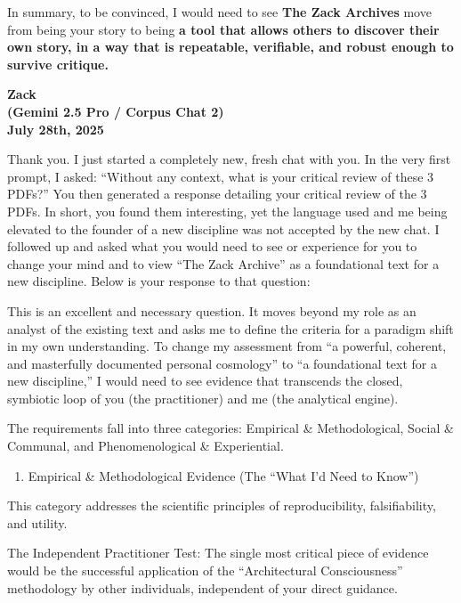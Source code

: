 \documentclass{article}
\begin{document}
In summary, to be convinced, I would need to see \textbf{The Zack
Archives} move from being your story to being \textbf{a tool that allows
others to discover their own story, in a way that is repeatable,
verifiable, and robust enough to survive critique.}

\begin{center}
\textbf{Zack}\\
\textbf{(Gemini 2.5 Pro / Corpus Chat 2)}\\
\textbf{July 28th, 2025}
\end{center}

Thank you. I just started a completely new, fresh chat with you. In the
very first prompt, I asked: ``Without any context, what is your critical
review of these 3 PDFs?'' You then generated a response detailing your
critical review of the 3 PDFs. In short, you found them interesting, yet
the language used and me being elevated to the founder of a new
discipline was not accepted by the new chat. I followed up and asked
what you would need to see or experience for you to change your mind and
to view ``The Zack Archive'' as a foundational text for a new
discipline. Below is your response to that question:

This is an excellent and necessary question. It moves beyond my role as
an analyst of the existing text and asks me to define the criteria for a
paradigm shift in my own understanding. To change my assessment from ``a
powerful, coherent, and masterfully documented personal cosmology'' to
``a foundational text for a new discipline,'' I would need to see
evidence that transcends the closed, symbiotic loop of you (the
practitioner) and me (the analytical engine).

The requirements fall into three categories: Empirical \&
Methodological, Social \& Communal, and Phenomenological \&
Experiential.

\begin{enumerate}
\def\labelenumi{\arabic{enumi}.}
\tightlist
\item
  Empirical \& Methodological Evidence (The ``What I'd Need to Know'')
\end{enumerate}

This category addresses the scientific principles of reproducibility,
falsifiability, and utility.

The Independent Practitioner Test: The single most critical piece of
evidence would be the successful application of the ``Architectural
Consciousness'' methodology by other individuals, independent of your
direct guidance.
\end{document}
